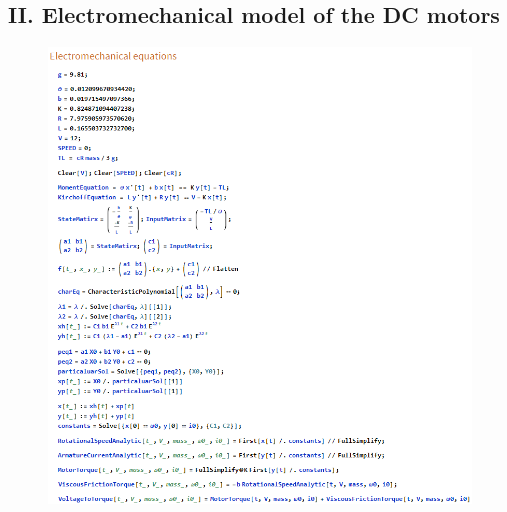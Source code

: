 \documentclass[12pt,english,twoside]{article}
\begin{document}
\subsection*{II. Electromechanical model of the DC motors}

\begin{figure}[htb!]
	\centering
	\includegraphics[width=\textwidth]{figures/attach_2.png}
\end{figure}
\end{document}
